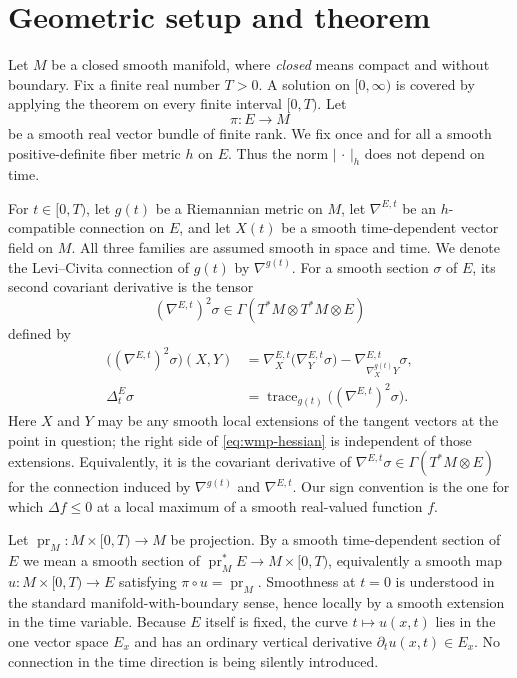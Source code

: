 \documentclass[10pt]{coll-l}
\newcommand{\trace}{\operatorname{trace}}
\theoremstyle{definition}
\theoremstyle{remark}
\numberwithin{section}{chapter}
\numberwithin{equation}{chapter}
\begin{document}
\section{Geometric setup and theorem}
\label{sec:wmp-setup}

Let $M$ be a closed smooth manifold, where \emph{closed} means compact and
without boundary.  Fix a finite real number $T>0$.  A solution on
$[0,\infty)$ is covered by applying the theorem on every finite interval
$[0,T)$.  Let
\[
   \pi:E\longrightarrow M
\]
be a smooth real vector bundle of finite rank.  We fix once and for all a
smooth positive-definite fiber metric $h$ on $E$.  Thus the norm
$|\,\cdot\,|_h$ does not depend on time.

For $t\in[0,T)$, let $g(t)$ be a Riemannian metric on $M$, let
$\nabla^{E,t}$ be an $h$-compatible connection on $E$, and let $X(t)$ be a
smooth time-dependent vector field on $M$.  All three families are assumed
smooth in space and time.  We denote the Levi--Civita connection of
$g(t)$ by $\nabla^{g(t)}$.  For a smooth section $\sigma$ of $E$, its second
covariant derivative is the tensor
\[
  (\nabla^{E,t})^2\sigma
     \in\Gamma(T^*M\otimes T^*M\otimes E)
\]
defined by
\begin{align}
 \bigl((\nabla^{E,t})^2\sigma\bigr)(X,Y)
   &=
   \nabla^{E,t}_X\bigl(\nabla^{E,t}_Y\sigma\bigr)
   -\nabla^{E,t}_{\nabla^{g(t)}_X Y}\sigma,                 \label{eq:wmp-hessian}\\
 \Delta_t^E\sigma
   &=\trace_{g(t)}\bigl((\nabla^{E,t})^2\sigma\bigr).
                                                               \label{eq:wmp-laplacian}
\end{align}
Here $X$ and $Y$ may be any smooth local extensions of the tangent vectors
at the point in question; the right side of \eqref{eq:wmp-hessian} is
independent of those extensions.  Equivalently, it is the covariant
derivative of $\nabla^{E,t}\sigma\in\Gamma(T^*M\otimes E)$ for the connection
induced by $\nabla^{g(t)}$ and $\nabla^{E,t}$.
Our sign convention is the one for which $\Delta f\leq0$ at a local maximum
of a smooth real-valued function $f$.

Let $\operatorname{pr}_M:M\times[0,T)\to M$ be projection.  By a smooth
time-dependent section of $E$ we mean a smooth section of
$\operatorname{pr}_M^*E\to M\times[0,T)$, equivalently a smooth map
$u:M\times[0,T)\to E$ satisfying $\pi\circ u=\operatorname{pr}_M$.
Smoothness at $t=0$ is understood in the standard
manifold-with-boundary sense, hence locally by a smooth extension in the
time variable.  Because $E$ itself is fixed, the curve $t\mapsto u(x,t)$
lies in the one vector space $E_x$ and has an ordinary vertical derivative
$\partial_tu(x,t)\in E_x$.  No connection in the time direction is being
silently introduced.
\end{document}
